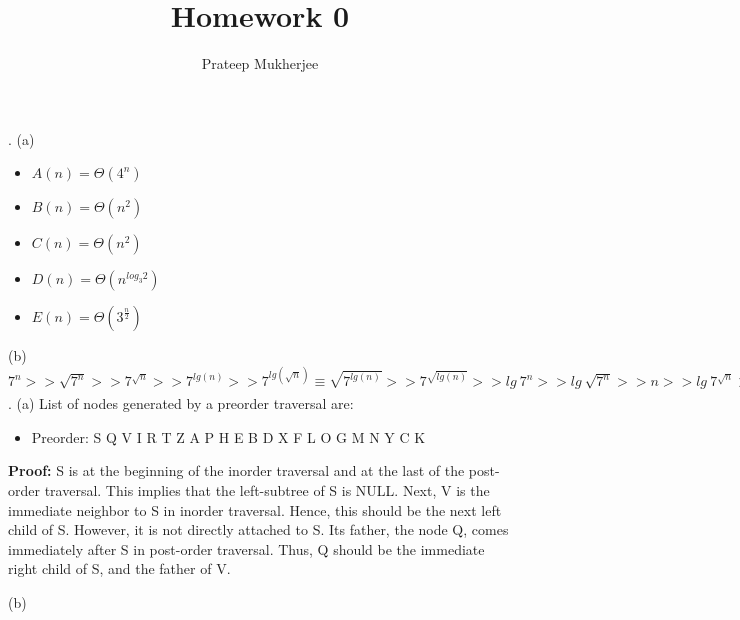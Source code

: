 \documentclass{article}
\title{Homework 0}
\author{Prateep Mukherjee}
\begin{document}
\maketitle

. (a) 
   
   \begin{itemize}
	\item $A(n) = \Theta \left( 4^{n}\right)$
	 \item $B(n) = \Theta \left( n^{2}\right)$ 
  	 \item $C(n) = \Theta \left( n^{2} \right)$ 
	 \item $D(n) = \Theta \left( n^{log_{3}{2}}\right)$
	 \item $E(n) = \Theta \left( 3^{\frac{n}{2}} \right) $
    \end{itemize}

(b) $ 7^{n}  >> \sqrt{7^{n}} >> 7^{\sqrt{n}} >> 7^{lg(n)} >> 7^{lg(\sqrt{n})} \equiv \sqrt{7^{lg(n)}} >> 7^{\sqrt{lg(n)}} >> lg \: 7^{n} >> lg \: \sqrt{7^n} >> n >> lg \: 7^{\sqrt{n}} >> \sqrt{lg \: 7^n} >> \sqrt{n} >> lg \: n >> lg \: \sqrt{n} > \sqrt{lg \: n}$  \\  

.   (a) List of nodes generated by a preorder traversal are: 

  \begin{itemize}
    \item  Preorder: S Q V I R T Z A P H E B D X F L O G M N Y C K
  \end{itemize}

{\bf Proof:}  S is at the beginning of the inorder traversal and at the last of the post-order traversal. This implies that the left-subtree of S is NULL. Next, V is the immediate neighbor to S in inorder traversal. Hence, this should be the next left child of S. However, it is not directly attached to S. Its father, the node Q, comes immediately after S in post-order traversal. Thus, Q should be the immediate right child of S, and the father of V.

\clearpage
(b) 
\end{document}
